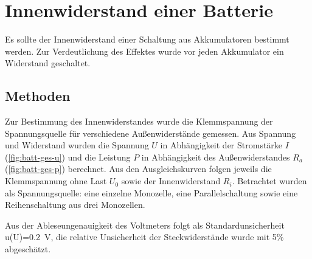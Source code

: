 



\section{Innenwiderstand einer Batterie}

Es sollte der Innenwiderstand einer Schaltung aus Akkumulatoren bestimmt werden. Zur Verdeutlichung des Effektes wurde vor jeden Akkumulator ein Widerstand geschaltet. 

\subsection{Methoden}


Zur Bestimmung des Innenwiderstandes wurde die Klemmspannung der Spannungsquelle für verschiedene Außenwiderstände gemessen. Aus Spannung und Widerstand wurden die Spannung $U$ in Abhängigkeit der Stromstärke $I$ (\cref{fig:batt-ges-u}) und die Leistung $P$ in Abhängigkeit des Außenwiderstandes $R_a$ (\cref{fig:batt-ges-p}) berechnet. Aus den Ausgleichskurven folgen jeweils die Klemmspannung ohne Last $U_0$ sowie der Innenwiderstand $R_i$. Betrachtet wurden als Spannungsquelle: eine einzelne Monozelle, eine Parallelschaltung sowie eine Reihenschaltung aus drei Monozellen. 

Aus der Ableseungenauigkeit des Voltmeters folgt als Standardunsicherheit u(U)=\SI{0.2}{V}, die relative Unsicherheit der Steckwiderstände wurde mit 5\% abgeschätzt.




